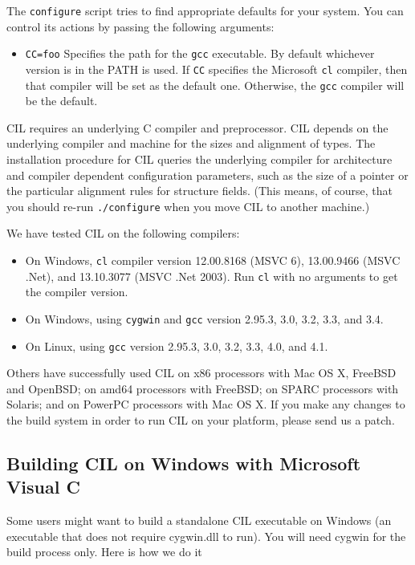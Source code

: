 \documentclass{article}
\def\t#1{{\tt #1}}
\begin{document}
 The \t{configure} script tries to find appropriate defaults for your system.
You can control its actions by passing the following arguments:
\begin{itemize}
\item \t{CC=foo} Specifies the path for the \t{gcc} executable. By default
whichever version is in the PATH is used. If \t{CC} specifies the Microsoft
\t{cl} compiler, then that compiler will be set as the default one. Otherwise,
the \t{gcc} compiler will be the default.
\end{itemize}

 CIL requires an underlying C compiler and preprocessor. CIL depends on the
underlying compiler and machine for the sizes and alignment of types. The
installation procedure for CIL queries the underlying compiler for
architecture and compiler dependent configuration parameters, such as the size
of a pointer or the particular alignment rules for structure fields. (This
means, of course, that you should re-run \t{./configure} when you move CIL to
another machine.)

We have tested CIL on the following compilers:

\begin{itemize}
\item On Windows, \t{cl} compiler version 12.00.8168 (MSVC 6),
  13.00.9466 (MSVC .Net), and 13.10.3077 (MSVC .Net 2003).  Run \t{cl}
  with no arguments to get the compiler version.  
\item On Windows, using \t{cygwin} and \t{gcc} version 2.95.3, 3.0,
  3.2, 3.3, and 3.4.
\item On Linux, using \t{gcc} version 2.95.3, 3.0, 3.2, 3.3, 4.0, and 4.1.
\end{itemize}

Others have successfully used CIL on x86 processors with Mac OS X,
FreeBSD and OpenBSD; on amd64 processors with FreeBSD; on SPARC
processors with Solaris; and on PowerPC processors with Mac OS X.  If
you make any changes to the build system in order to run CIL on your
platform, please send us a patch.

  \subsection{Building CIL on Windows with Microsoft Visual C}

 Some users might want to build a standalone CIL executable on Windows (an
executable that does not require cygwin.dll to run). You will need cygwin for
the build process only. Here is how we do it
\end{document}
